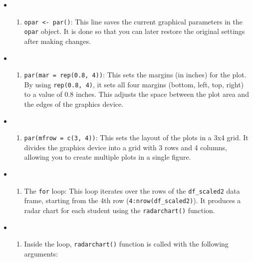 \documentclass[
]{article}
\providecommand{\tightlist}{%
  \setlength{\itemsep}{0pt}\setlength{\parskip}{0pt}}
\begin{document}
\begin{itemize}
\item
  \begin{enumerate}
  \def\labelenumi{\arabic{enumi}.}
  \tightlist
  \item
    \texttt{opar\ \textless{}-\ par()}: This line saves the current
    graphical parameters in the \texttt{opar} object. It is done so that
    you can later restore the original settings after making changes.
  \end{enumerate}
\item
  \begin{enumerate}
  \def\labelenumi{\arabic{enumi}.}
  \setcounter{enumi}{1}
  \tightlist
  \item
    \texttt{par(mar\ =\ rep(0.8,\ 4))}: This sets the margins (in
    inches) for the plot. By using \texttt{rep(0.8,\ 4)}, it sets all
    four margins (bottom, left, top, right) to a value of 0.8 inches.
    This adjusts the space between the plot area and the edges of the
    graphics device.
  \end{enumerate}
\item
  \begin{enumerate}
  \def\labelenumi{\arabic{enumi}.}
  \setcounter{enumi}{2}
  \tightlist
  \item
    \texttt{par(mfrow\ =\ c(3,\ 4))}: This sets the layout of the plots
    in a 3x4 grid. It divides the graphics device into a grid with 3
    rows and 4 columns, allowing you to create multiple plots in a
    single figure.
  \end{enumerate}
\item
  \begin{enumerate}
  \def\labelenumi{\arabic{enumi}.}
  \setcounter{enumi}{3}
  \tightlist
  \item
    The \texttt{for} loop: This loop iterates over the rows of the
    \texttt{df\_scaled2} data frame, starting from the 4th row
    (\texttt{4:nrow(df\_scaled2)}). It produces a radar chart for each
    student using the \texttt{radarchart()} function.
  \end{enumerate}
\item
  \begin{enumerate}
  \def\labelenumi{\arabic{enumi}.}
  \setcounter{enumi}{4}
  \tightlist
  \item
    Inside the loop, \texttt{radarchart()} function is called with the
    following arguments:
  \end{enumerate}


\end{itemize}
\end{document}
